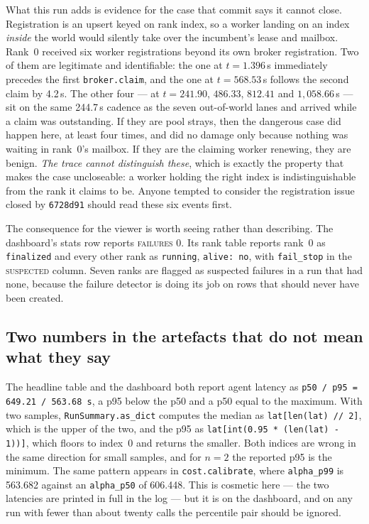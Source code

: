 \documentclass[11pt]{article}
\begin{document}
What this run adds is evidence for the case that commit says it cannot close. Registration is
an upsert keyed on rank index, so a worker landing on an index \emph{inside} the world would
silently take over the incumbent's lease and mailbox. Rank~0 received six worker registrations
beyond its own broker registration. Two of them are legitimate and identifiable: the one at
$t=1.396$\,s immediately precedes the first \texttt{broker.claim}, and the one at
$t=568.53$\,s follows the second claim by 4.2\,s. The other four --- at $t=241.90$, $486.33$,
$812.41$ and $1{,}058.66$\,s --- sit on the same 244.7\,s cadence as the seven out-of-world
lanes and arrived while a claim was outstanding. If they are pool strays, then the dangerous
case did happen here, at least four times, and did no damage only because nothing was waiting
in rank~0's mailbox. If they are the claiming worker renewing, they are benign. \emph{The
trace cannot distinguish these}, which is exactly the property that makes the case
uncloseable: a worker holding the right index is indistinguishable from the rank it claims to
be. Anyone tempted to consider the registration issue closed by \texttt{6728d91} should read
these six events first.

The consequence for the viewer is worth seeing rather than describing. The dashboard's stats
row reports \textsc{failures} 0. Its rank table reports rank~0 as \texttt{finalized} and every
other rank as \texttt{running}, \texttt{alive: no}, with \texttt{fail\_stop} in the
\textsc{suspected} column. Seven ranks are flagged as suspected failures in a run that had
none, because the failure detector is doing its job on rows that should never have been
created.

\subsection*{Two numbers in the artefacts that do not mean what they say}

The headline table and the dashboard both report agent latency as
\texttt{p50 / p95 = 649.21 / 563.68\,s}, a p95 below the p50 and a p50 equal to the maximum.
With two samples, \texttt{RunSummary.as\_dict} computes the median as
\texttt{lat[len(lat) // 2]}, which is the upper of the two, and the p95 as
\texttt{lat[int(0.95 * (len(lat) - 1))]}, which floors to index~0 and returns the smaller.
Both indices are wrong in the same direction for small samples, and for $n = 2$ the reported
p95 is the minimum. The same pattern appears in \texttt{cost.calibrate}, where
\texttt{alpha\_p99} is 563.682 against an \texttt{alpha\_p50} of 606.448. This is cosmetic here
--- the two latencies are printed in full in the log --- but it is on the dashboard, and on
any run with fewer than about twenty calls the percentile pair should be ignored.
\end{document}
